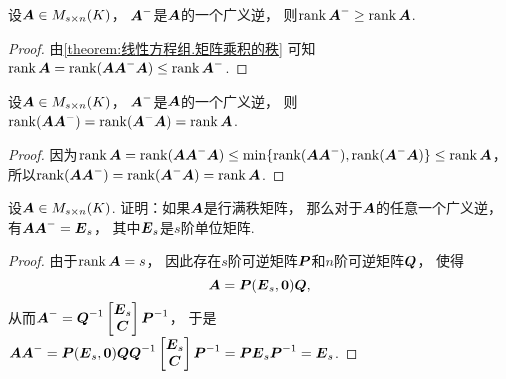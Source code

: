 \begin{property}
设\(\boldsymbol{A} \in M_{s \times n}(K)\)，
\(\boldsymbol{A}^-\)是\(\boldsymbol{A}\)的一个广义逆，
则\(\rank\boldsymbol{A}^- \geq \rank\boldsymbol{A}\).
\begin{proof}
由\cref{theorem:线性方程组.矩阵乘积的秩} 可知\(
	\rank\boldsymbol{A}
	= \rank(\boldsymbol{A} \boldsymbol{A}^- \boldsymbol{A})
	\leq \rank\boldsymbol{A}^-
\).
\end{proof}
\end{property}

\begin{property}
设\(\boldsymbol{A} \in M_{s \times n}(K)\)，
\(\boldsymbol{A}^-\)是\(\boldsymbol{A}\)的一个广义逆，
则\(
	\rank(\boldsymbol{A} \boldsymbol{A}^-)
	= \rank(\boldsymbol{A}^- \boldsymbol{A})
	= \rank\boldsymbol{A}
\).
\begin{proof}
因为\(
	\rank\boldsymbol{A}
	= \rank(\boldsymbol{A} \boldsymbol{A}^- \boldsymbol{A})
	\leq \min\{
		\rank(\boldsymbol{A} \boldsymbol{A}^-),
		\rank(\boldsymbol{A}^- \boldsymbol{A})
	\}
	\leq \rank\boldsymbol{A}
\)，
所以\(
	\rank(\boldsymbol{A} \boldsymbol{A}^-)
	\allowbreak
	= \rank(\boldsymbol{A}^- \boldsymbol{A})
	= \rank\boldsymbol{A}
\).
\end{proof}
\end{property}

\begin{example}
设\(\boldsymbol{A} \in M_{s \times n}(K)\).
证明：如果\(\boldsymbol{A}\)是行满秩矩阵，
那么对于\(\boldsymbol{A}\)的任意一个广义逆，
有\(\boldsymbol{A} \boldsymbol{A}^- = \boldsymbol{E}_s\)，
其中\(\boldsymbol{E}_s\)是\(s\)阶单位矩阵.
\begin{proof}
由于\(\rank\boldsymbol{A} = s\)，
因此存在\(s\)阶可逆矩阵\(\boldsymbol{P}\)和\(n\)阶可逆矩阵\(\boldsymbol{Q}\)，
使得\begin{equation*}
	\boldsymbol{A} = \boldsymbol{P} (\boldsymbol{E}_s,\boldsymbol0) \boldsymbol{Q},
\end{equation*}
从而\(
	\boldsymbol{A}^-
	= \boldsymbol{Q}^{-1}
	\begin{bmatrix}
		\boldsymbol{E}_s \\
		\boldsymbol{C}
	\end{bmatrix}
	\boldsymbol{P}^{-1}
\)，
于是\(
	\boldsymbol{A} \boldsymbol{A}^-
	= \boldsymbol{P}
	(\boldsymbol{E}_s,\boldsymbol0)
	\boldsymbol{Q}
	\boldsymbol{Q}^{-1}
	\begin{bmatrix}
		\boldsymbol{E}_s \\
		\boldsymbol{C}
	\end{bmatrix}
	\boldsymbol{P}^{-1}
	= \boldsymbol{P} \boldsymbol{E}_s \boldsymbol{P}^{-1}
	= \boldsymbol{E}_s
\).
\end{proof}
\end{example}


